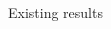 \documentclass[final,hyperref={pdfpagelabels=false}]{beamer}
\begin{document}
\begin{frame}[t]
\begin{columns}[t]
\begin{column}{.30\textwidth}
\begin{block}{\rule{0pt}{2.5ex} Existing results}
\begin{itemize}
\end{itemize}
\end{block}


\end{column}
\end{columns}
\end{frame}
\end{document}
